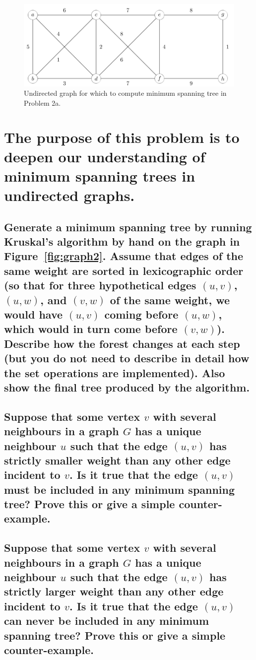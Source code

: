 \documentclass[a4paper,12pt]{article}
\begin{document}
\begin{figure}[H]
    \centering
    \includegraphics[width=1\textwidth]{2.png}
    \caption{Undirected graph for which to compute minimum spanning tree in Problem 2a.}
\end{figure}
\section[Question 2]{The purpose of this problem is to deepen our understanding of minimum spanning trees in undirected graphs.}
\subsection{Generate a minimum spanning tree by running Kruskal's algorithm by hand on the graph in Figure~\ref{fig:graph2}. Assume that edges of the same weight are sorted in lexicographic order (so that for three hypothetical edges $(u, v)$, $(u, w)$, and $(v, w)$ of the same weight, we would have $(u, v)$ coming before $(u, w)$, which would in turn come before $(v, w)$). Describe how the forest changes at each step (but you do not need to describe in detail how the set operations are implemented). Also show the final tree produced by the algorithm.}



\subsection{Suppose that some vertex $v$ with several neighbours in a graph $G$ has a unique neighbour $u$ such that the edge $(u, v)$ has strictly smaller weight than any other edge incident to $v$. Is it true that the edge $(u, v)$ must be included in any minimum spanning tree? Prove this or give a simple counter-example.}



\subsection{Suppose that some vertex $v$ with several neighbours in a graph $G$ has a unique neighbour $u$ such that the edge $(u, v)$ has strictly larger weight than any other edge incident to $v$. Is it true that the edge $(u, v)$ can never be included in any minimum spanning tree? Prove this or give a simple counter-example.}
\end{document}
